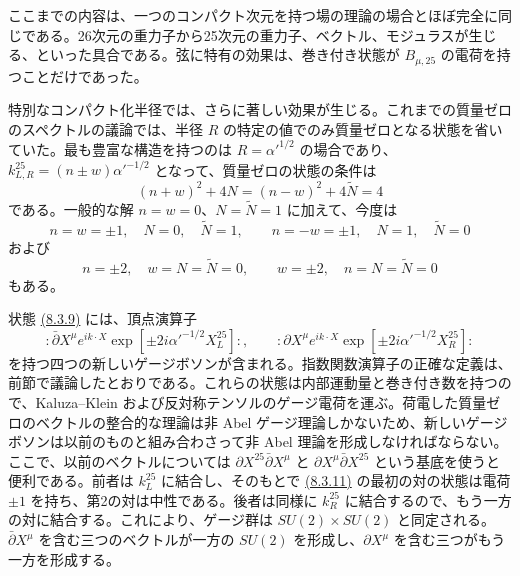 
ここまでの内容は、一つのコンパクト次元を持つ場の理論の場合とほぼ完全に同じである。26次元の重力子から25次元の重力子、ベクトル、モジュラスが生じる、といった具合である。弦に特有の効果は、巻き付き状態が $B_{\mu,25}$ の電荷を持つことだけであった。

特別なコンパクト化半径では、さらに著しい効果が生じる。これまでの質量ゼロのスペクトルの議論では、半径 $R$ の特定の値でのみ質量ゼロとなる状態を省いていた。最も豊富な構造を持つのは $R=\alpha'^{1/2}$ の場合であり、$k_{L,R}^{25}=(n\pm w)\alpha'^{-1/2}$ となって、質量ゼロの状態の条件は
\begin{equation}
(n+w)^2+4N=(n-w)^2+4\widetilde N=4
\tag{8.3.8}\label{eq:8.3.8}
\end{equation}
である。一般的な解 $n=w=0$、$N=\widetilde N=1$ に加えて、今度は
\begin{equation}
n=w=\pm1,\quad N=0,\quad\widetilde N=1,
\qquad n=-w=\pm1,\quad N=1,\quad\widetilde N=0
\tag{8.3.9}\label{eq:8.3.9}
\end{equation}
および
\begin{equation}
n=\pm2,\quad w=N=\widetilde N=0,
\qquad w=\pm2,\quad n=N=\widetilde N=0
\tag{8.3.10}\label{eq:8.3.10}
\end{equation}
もある。

状態 \hyperref[eq:8.3.9]{(8.3.9)} には、頂点演算子
\begin{equation}
:\bar\partial X^\mu e^{ik\cdot X}\exp[\pm2i\alpha'^{-1/2}X_L^{25}]:,
\qquad :\partial X^\mu e^{ik\cdot X}\exp[\pm2i\alpha'^{-1/2}X_R^{25}]:
\tag{8.3.11}\label{eq:8.3.11}
\end{equation}
を持つ四つの新しいゲージボソンが含まれる。指数関数演算子の正確な定義は、前節で議論したとおりである。これらの状態は内部運動量と巻き付き数を持つので、Kaluza--Klein および反対称テンソルのゲージ電荷を運ぶ。荷電した質量ゼロのベクトルの整合的な理論は非 Abel ゲージ理論しかないため、新しいゲージボソンは以前のものと組み合わさって非 Abel 理論を形成しなければならない。ここで、以前のベクトルについては $\partial X^{25}\bar\partial X^\mu$ と $\partial X^\mu\bar\partial X^{25}$ という基底を使うと便利である。前者は $k_L^{25}$ に結合し、そのもとで \hyperref[eq:8.3.11]{(8.3.11)} の最初の対の状態は電荷 $\pm1$ を持ち、第2の対は中性である。後者は同様に $k_R^{25}$ に結合するので、もう一方の対に結合する。これにより、ゲージ群は $SU(2)\times SU(2)$ と同定される。$\bar\partial X^\mu$ を含む三つのベクトルが一方の $SU(2)$ を形成し、$\partial X^\mu$ を含む三つがもう一方を形成する。

